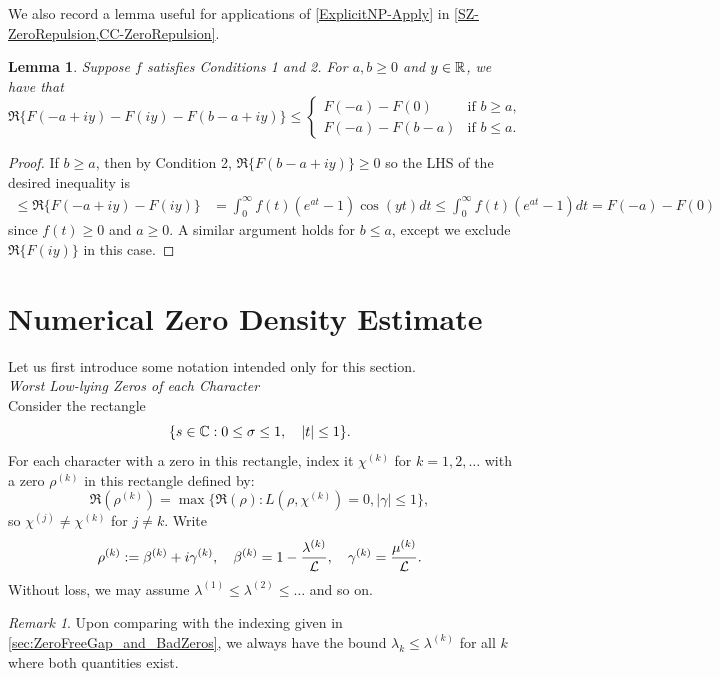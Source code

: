 \documentclass[12pt,psamsfonts]{amsart}
\newtheorem{lem}[thm]{Lemma}
\theoremstyle{definition}
\theoremstyle{remark}
\newtheorem*{rem*}{Remark}
\numberwithin{equation}{section}
\newcounter{notation}
\begin{document}
We also record a lemma useful for applications of \cref{ExplicitNP-Apply} in \cref{SZ-ZeroRepulsion,CC-ZeroRepulsion}. 

%
\begin{lem} \label{RepelLemma} Suppose $f$ satisfies Conditions 1 and 2. For $a,b \geq 0$ and $y  \in \mathbb{R}$, we have that
\[
\Re\{ F(-a + iy) - F(iy) - F(b-a + iy) \} \leq 
\begin{cases} F(-a) - F(0) & \text{if } b \geq a, \\ 
F(-a) - F(b-a) & \text{if } b \leq a.
\end{cases} 
\]
\end{lem}
\begin{proof} If $b \geq a$, then by Condition 2, $\Re\{F(b-a+iy)\} \geq 0$ so the LHS of the desired inequality is
\begin{align*}
\leq \Re\{F(-a+iy)-F(iy) \}  & = \int_0^{\infty} f(t) (e^{at}-1) \cos(yt) dt   \leq \int_0^{\infty} f(t) (e^{at}-1) dt  = F(-a) - F(0)
\end{align*}
since $f(t) \geq 0$ and $a \geq 0$. A similar argument holds for $b \leq a$, except we exclude $\Re\{F(iy)\}$ in this case. 
\end{proof}

\section{Numerical Zero Density Estimate}
\label{NewZeroDensityEstimate}
Let us first introduce some notation intended only for this section. \\

\noindent
\emph{Worst Low-lying Zeros of each Character} \\
	Consider the rectangle
	\[
	 \{ s \in \mathbb{C} : 0 \leq \sigma \leq 1, \quad |t| \leq 1\}. 
	\]
	For each character with a zero in this rectangle, index it $\chi^{(k)}$ for $k=1,2,\dots$ with a zero $\rho^{(k)}$ in this rectangle defined by:
	\[
	\Re(\rho^{(k)}) = \max\{ \Re(\rho) : L(\rho, \chi^{(k)}) = 0, |\gamma| \leq 1\},
	\]
	so $\chi^{(j)} \neq \chi^{(k)}$ for $j \neq k$. Write
	\[
	\rho^{(k)} := \beta^{(k)} + i\gamma^{(k)}, \quad \beta^{(k)} = 1 - \frac{\lambda^{(k)}}{\mathcal{L}}, \quad \gamma^{(k)} = \frac{\mu^{(k)}}{\mathcal{L}}. 
	\]
	Without loss, we may assume $\lambda^{(1)} \leq \lambda^{(2)} \leq \dots$ and so on. 

	\begin{rem*} Upon comparing with the indexing given in \cref{sec:ZeroFreeGap_and_BadZeros}, we always have the bound $\lambda_k \leq \lambda^{(k)}$ for all $k$ where both quantities exist. 
	\end{rem*}
\end{document}

